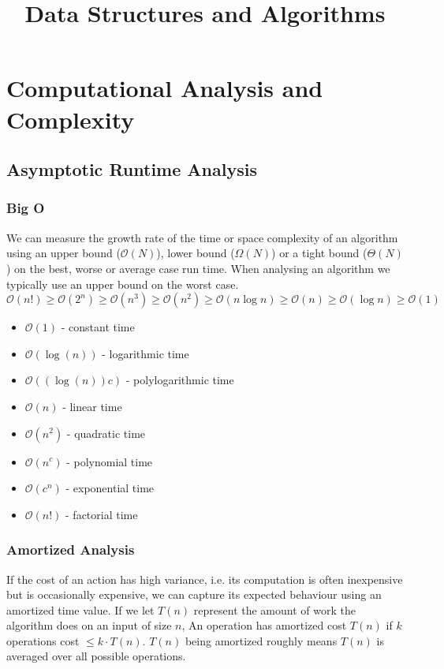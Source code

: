 \documentclass{article}
\title{\vspace{-3cm} Data Structures and Algorithms}
\author{}
\date{}
\newcommand{\bigO}{\ensuremath{\mathcal{O}}}
\begin{document}
\maketitle
\vspace{-1.5cm}
\tableofcontents
\newpage

\section{Computational Analysis and Complexity}

\subsection{Asymptotic Runtime Analysis}
\subsubsection{Big O}
We can measure the growth rate of the time or space complexity of an algorithm using an upper bound ($\bigO(N)$), lower bound ($\Omega (N) $) or a tight bound ($\Theta (N)$) on the best, worse or average case run time. When analysing an algorithm we typically use an upper bound on the worst case. 
\[
\bigO(n!) \geq \bigO(2^n)  \geq \bigO( n^3)  \geq \bigO(n^2)  \geq \bigO(n \log n)  \geq \bigO(n)  \geq \bigO(\log n)  \geq \bigO(1)
\]
\begin{multicols}{2}
\begin{itemize}
    \item[] $\bigO(1)$ - constant time
    \item[] $\bigO(\log(n))$ - logarithmic time
    \item[] $\bigO((\log(n))c)$ - polylogarithmic time
    \item[] $\bigO(n)$ - linear time
    \item[] $\bigO(n^2)$ - quadratic time
    \item[] $\bigO(n^c)$ - polynomial time
    \item[] $\bigO(c^n)$ - exponential time
    \item[] $\bigO(n!)$ - factorial time
\end{itemize}
\end{multicols}

\subsubsection{Amortized Analysis}
If the cost of an action has high variance, i.e. its computation is often inexpensive but is occasionally expensive, we can capture its expected behaviour using an amortized time value. If we let $T(n)$ represent the amount of work the algorithm does on an input of size $n$, An operation has amortized cost $T(n)$ if $k$ operations cost $\leq k \cdot T(n)$. $T(n)$ being amortized roughly means $T(n)$ is averaged over all possible operations. 
\end{document}
